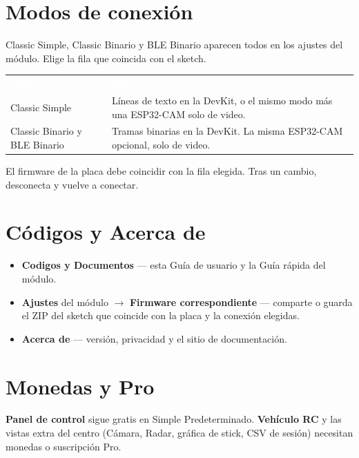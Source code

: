 \documentclass[12pt,a4paper]{article}
\newcommand{\thc}[1]{\textcolor{white}{\bfseries #1}}
\newcommand{\ui}[1]{\textsf{\textbf{#1}}}
\begin{document}
\section{Modos de conexión}
\label{sec:modes}

Classic Simple, Classic Binario y BLE Binario aparecen todos en los
ajustes del módulo. Elige la fila que coincida con el sketch.

\begin{center}
\renewcommand{\arraystretch}{1.22}
\begin{tabular}{>{\raggedright\arraybackslash}p{3.2cm}
                >{\raggedright\arraybackslash}p{9.0cm}}
\rowcolor{TblHead}
\thc{Modo} & \thc{Enlace} \\
\rowcolor{TblChan}
Classic Simple &
  Líneas de texto en la DevKit, o el mismo modo más una ESP32-CAM solo de video. \\
\rowcolor{TblSync}
Classic Binario y BLE Binario &
  Tramas binarias en la DevKit. La misma ESP32-CAM opcional, solo de video. \\
\end{tabular}
\end{center}

El firmware de la placa debe coincidir con la fila elegida.
Tras un cambio, desconecta y vuelve a conectar.

\section{Códigos y Acerca de}
\label{sec:docs}

\begin{itemize}[leftmargin=1.4cm]
  \item \ui{Codigos y Documentos} --- esta Guía de usuario y la Guía rápida
        del módulo.
  \item \ui{Ajustes} del módulo $\rightarrow$ \ui{Firmware correspondiente}
        --- comparte o guarda el ZIP del sketch que coincide con la placa y
        la conexión elegidas.
  \item \ui{Acerca de} --- versión, privacidad y el sitio de documentación.
\end{itemize}

\section{Monedas y Pro}
\label{sec:coins}

\ui{Panel de control} sigue gratis en Simple Predeterminado.
\ui{Vehículo RC} y las vistas extra del centro
(Cámara, Radar, gráfica de stick, CSV de sesión) necesitan monedas o
suscripción Pro.
\end{document}
